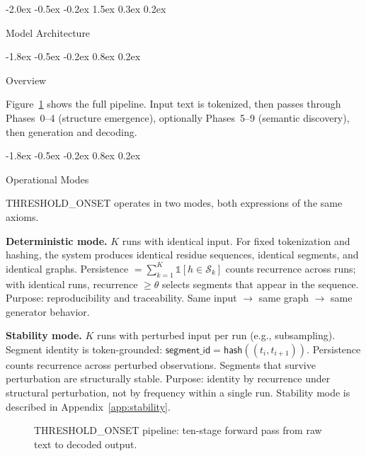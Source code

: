 \documentclass[10pt]{article}
\makeatletter
\renewcommand{\section}{\@startsection{section}{1}{\z@}%
  {-2.0ex \@plus -0.5ex \@minus -0.2ex}%
  {1.5ex \@plus 0.3ex \@minus 0.2ex}%
  {\large\bfseries\raggedright}}
\renewcommand{\subsection}{\@startsection{subsection}{2}{\z@}%
  {-1.8ex \@plus -0.5ex \@minus -0.2ex}%
  {0.8ex \@plus 0.2ex}%
  {\normalsize\bfseries\raggedright}}
\makeatother
\begin{document}
\section{Model Architecture}
\label{sec:model}

\subsection{Overview}

Figure~\ref{fig:pipeline} shows the full pipeline. Input text is tokenized, then passes
through Phases~0--4 (structure emergence), optionally Phases~5--9 (semantic discovery),
then generation and decoding.

\subsection{Operational Modes}

THRESHOLD\_ONSET operates in two modes, both expressions of the same axioms.

\textbf{Deterministic mode.}
$K$ runs with identical input. For fixed tokenization and hashing, the system produces
identical residue sequences, identical segments, and identical graphs.
Persistence $= \sum_{k=1}^{K} \mathbb{1}[h \in \mathcal{S}_k]$ counts recurrence across
runs; with identical runs, recurrence $\geq \theta$ selects segments that appear in the
sequence. Purpose: reproducibility and traceability. Same input $\rightarrow$ same
graph $\rightarrow$ same generator behavior.

\textbf{Stability mode.}
$K$ runs with perturbed input per run (e.g., subsampling). Segment identity is
token-grounded: $\mathsf{segment\_id} = \mathsf{hash}((t_i, t_{i+1}))$. Persistence
counts recurrence across perturbed observations. Segments that survive perturbation are
structurally stable. Purpose: identity by recurrence under structural perturbation, not
by frequency within a single run. Stability mode is described in
Appendix~\ref{app:stability}.

\begin{figure}[t]
\centering
{}
\caption{THRESHOLD\_ONSET pipeline: ten-stage forward pass from raw text to decoded output.}
\label{fig:pipeline}
\end{figure}
\end{document}
